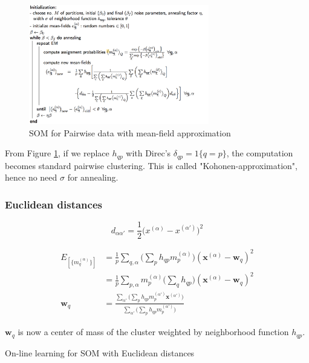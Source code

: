 \begin{figure}[hbt]
	\center
  \includegraphics[width=0.7\textwidth]{figures/cl-som-pairwise}
  \caption{SOM for Pairwise data with mean-field approximation}
  \label{fig:cl-som-pairwise}
\end{figure}

From Figure \ref{fig:cl-som-pairwise}, if we replace $h_{qp}$ with Direc's $\delta_{qp} = 1\{ q = p \}$, the computation becomes standard pairwise clustering. This is called "Kohonen-approximation", hence no need $\sigma$  for annealing.

\subsubsection{Euclidean distances}
$$
d_{\alpha\alpha'} = \frac{1}{2} \bigg ( x^{(\alpha)} - x^{(\alpha')} \bigg )^2
$$

\begin{align*}
	E_{[ \{ m_q^{(\alpha)} \} ]} &= \frac{1}{p} \sum_{q,\alpha} \bigg (\sum_p h_{qp} m_p^{(\alpha)} \bigg ) ( \boldsymbol{x}^{(\alpha)} - \boldsymbol{w}_q)^2 \\
	&= \frac{1}{p} \sum_{p,\alpha} m_p^{(\alpha)} \bigg ( \sum_q h_{qp}  \bigg ) ( \boldsymbol{x}^{(\alpha)} - \boldsymbol{w}_q)^2 \\
	\boldsymbol{w}_q  &= \frac{\sum_{\alpha'}\bigg ( \sum_p h_{qp} m_p^{(\alpha')} \boldsymbol{x}^{(\alpha')} \bigg)  }{\sum_{\alpha'}\bigg ( \sum_p h_{qp} m_p^{(\alpha')} \bigg )}
\end{align*}

$\boldsymbol{w}_q$ is now a center of mass of the cluster weighted by neighborhood function $h_{qp}$.

\begin{algorithm}[H]
\caption{On-line learning for SOM with Euclidean distances}
\end{algorithm}

